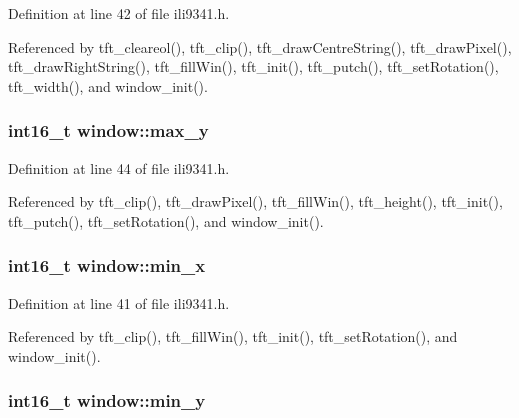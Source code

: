 Definition at line 42 of file ili9341.\-h.



Referenced by tft\-\_\-cleareol(), tft\-\_\-clip(), tft\-\_\-draw\-Centre\-String(), tft\-\_\-draw\-Pixel(), tft\-\_\-draw\-Right\-String(), tft\-\_\-fill\-Win(), tft\-\_\-init(), tft\-\_\-putch(), tft\-\_\-set\-Rotation(), tft\-\_\-width(), and window\-\_\-init().

\hypertarget{structwindow_a84f9c809e082563b33f845f3b1da9bf3}{
\subsubsection[{max\-\_\-y}]{\setlength{\rightskip}{0pt plus 5cm}int16\-\_\-t window\-::max\-\_\-y}}\label{structwindow_a84f9c809e082563b33f845f3b1da9bf3}


Definition at line 44 of file ili9341.\-h.



Referenced by tft\-\_\-clip(), tft\-\_\-draw\-Pixel(), tft\-\_\-fill\-Win(), tft\-\_\-height(), tft\-\_\-init(), tft\-\_\-putch(), tft\-\_\-set\-Rotation(), and window\-\_\-init().

\hypertarget{structwindow_ad6317eef8afe6cee398bfaae876f8a1d}{
\subsubsection[{min\-\_\-x}]{\setlength{\rightskip}{0pt plus 5cm}int16\-\_\-t window\-::min\-\_\-x}}\label{structwindow_ad6317eef8afe6cee398bfaae876f8a1d}


Definition at line 41 of file ili9341.\-h.



Referenced by tft\-\_\-clip(), tft\-\_\-fill\-Win(), tft\-\_\-init(), tft\-\_\-set\-Rotation(), and window\-\_\-init().

\hypertarget{structwindow_a33d39097fba2f3267bb0c003e88f4cd8}{
\subsubsection[{min\-\_\-y}]{\setlength{\rightskip}{0pt plus 5cm}int16\-\_\-t window\-::min\-\_\-y}}\label{structwindow_a33d39097fba2f3267bb0c003e88f4cd8}


